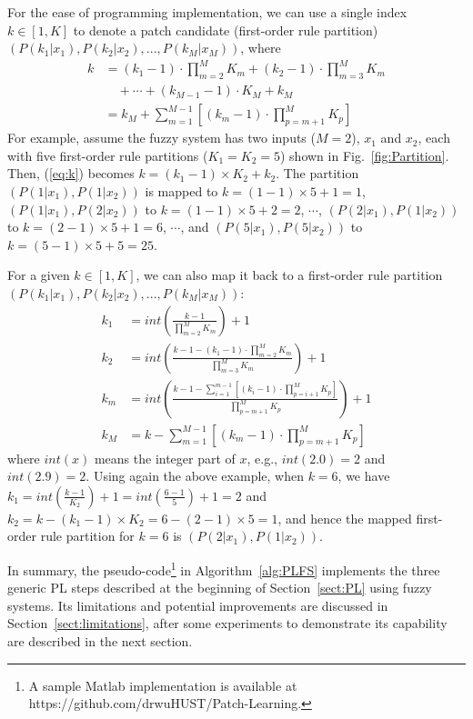 \documentclass[journal,twocolumn]{IEEEtran}
\begin{document}
For the ease of programming implementation, we can use a single index $k\in[1,K]$ to denote a patch candidate (first-order rule partition) $(P(k_1|x_1),P(k_2|x_2),...,P(k_M|x_M))$, where
\begin{align}
k&=(k_1-1)\cdot \prod_{m=2}^M K_m+(k_2-1)\cdot \prod_{m=3}^M K_m \nonumber \\
 &\quad +\cdots+(k_{M-1}-1)\cdot K_M+k_M\nonumber \\
&=k_M+\sum_{m=1}^{M-1}\left[ (k_m-1)\cdot \prod_{p=m+1}^M K_p\right] \label{eq:k}
\end{align}
For example, assume the fuzzy system has two inputs ($M=2$), $x_1$ and $x_2$, each with five first-order rule partitions ($K_1=K_2=5$) shown in Fig.~\ref{fig:Partition}. Then, (\ref{eq:k}) becomes $k=(k_1-1)\times K_2+k_2$. The partition $(P(1|x_1),P(1|x_2))$ is mapped to $k=(1-1)\times 5+1=1$, $(P(1|x_1),P(2|x_2))$ to $k=(1-1)\times 5+2=2$, $\cdots$, $(P(2|x_1),P(1|x_2))$ to $k=(2-1)\times5+1=6$, $\cdots$, and $(P(5|x_1),P(5|x_2))$ to $k=(5-1)\times 5+5=25$.


For a given $k\in[1,K]$, we can also map it back to a first-order rule partition $(P(k_1|x_1),P(k_2|x_2),...,P(k_M|x_M))$:
\begin{align}
k_1&=int\left(\frac{k-1}{\prod_{m=2}^M K_m}\right)+1 \label{eq:k1}\\
k_2&=int\left(\frac{k-1-(k_1-1)\cdot \prod_{m=2}^M K_m}{\prod_{m=3}^M K_m}\right)+1\\
k_m&=int\left(\frac{k-1-\sum_{i=1}^{m-1}\left[(k_i-1)\cdot \prod_{p=i+1}^M K_p\right]}{\prod_{p=m+1}^M K_p}\right)+1\\
k_M&=k-\sum_{m=1}^{M-1}\left[ (k_m-1)\cdot \prod_{p=m+1}^M K_p\right] \label{eq:kM}
\end{align}
where $int(x)$ means the integer part of $x$, e.g., $int(2.0)=2$ and $int(2.9)=2$. Using again the above example, when $k=6$, we have $k_1=int(\frac{k-1}{K_2})+1=int(\frac{6-1}{5})+1=2$ and $k_2=k-(k_1-1)\times K_2=6-(2-1)\times 5=1$, and hence the mapped first-order rule partition for $k=6$ is $(P(2|x_1),P(1|x_2))$.

In summary, the pseudo-code\footnote{A sample Matlab implementation is available at https://github.com/drwuHUST/Patch-Learning.} in Algorithm~\ref{alg:PLFS} implements the three generic PL steps described at the beginning of Section~\ref{sect:PL} using fuzzy systems. Its limitations and potential improvements are discussed in Section~\ref{sect:limitations}, after some experiments to demonstrate its capability are described in the next section.
\end{document}
